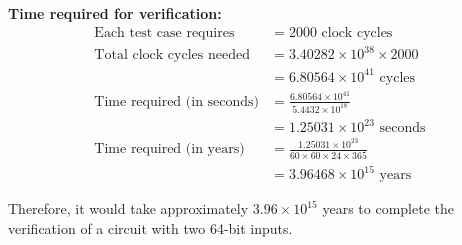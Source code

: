 \documentclass{article}
\begin{document}
\textbf{Time required for verification:}
\begin{align*}
\text{Each test case requires} &= 2000 \text{ clock cycles} \\
\text{Total clock cycles needed} &= 3.40282 \times 10^{38} \times 2000 \\
&= 6.80564 \times 10^{41} \text{ cycles} \\
\text{Time required (in seconds)} &= \frac{6.80564 \times 10^{41}}{5.4432 \times 10^{18}} \\
&= 1.25031 \times 10^{23} \text{ seconds} \\
\text{Time required (in years)} &= \frac{1.25031 \times 10^{23}}{60 \times 60 \times 24 \times 365} \\
&= 3.96468 \times 10^{15} \text{ years}
\end{align*}

Therefore, it would take approximately $3.96 \times 10^{15}$ years to complete the verification of a circuit with two 64-bit inputs.
\end{document}
